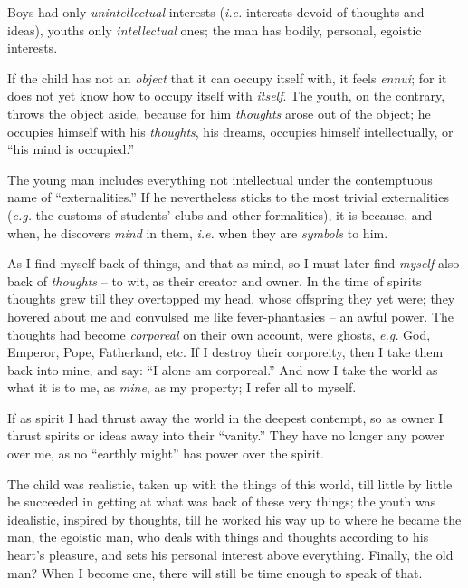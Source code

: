 Boys had only \textit{unintellectual} interests (\textit{i.e.} interests 
devoid of thoughts and ideas), youths only \textit{intellectual} ones; the man 
has bodily, personal, egoistic interests.

If the child has not an \textit{object} that it can occupy itself with, it 
feels \textit{ennui}; for it does not yet know how to occupy itself with 
\textit{itself}. The youth, on the contrary, throws the object aside, because 
for him \textit{thoughts} arose out of the object; he occupies himself with 
his \textit{thoughts}, his dreams, occupies himself intellectually, or ``his 
mind is occupied.''

The young man includes everything not intellectual under the contemptuous name 
of ``externalities.'' If he nevertheless sticks to the most trivial 
externalities (\textit{e.g.} the customs of students' clubs and other 
formalities), it is because, and when, he discovers \textit{mind} in them, 
\textit{i.e.} when they are \textit{symbols} to him.

As I find myself back of things, and that as mind, so I must later find 
\textit{myself} also back of \textit{thoughts} -- to wit, as their creator and 
owner. In the time of spirits thoughts grew till they overtopped my head, 
whose offspring they yet were; they hovered about me and convulsed me like 
fever-phantasies -- an awful power. The thoughts had become \textit{corporeal} 
on their own account, were ghosts, \textit{e.g.} God, Emperor, Pope, 
Fatherland, etc. If I destroy their corporeity, then I take them back into 
mine, and say: ``I alone am corporeal.'' And now I take the world as what it 
is to me, as \textit{mine}, as my property; I refer all to myself.

If as spirit I had thrust away the world in the deepest contempt, so as owner 
I thrust spirits or ideas away into their ``vanity.'' They have no longer 
any power over me, as no ``earthly might'' has power over the spirit.

The child was realistic, taken up with the things of this world, till little 
by little he succeeded in getting at what was back of these very things; the 
youth was idealistic, inspired by thoughts, till he worked his way up to where 
he became the man, the egoistic man, who deals with things and thoughts 
according to his heart's pleasure, and sets his personal interest above 
everything. Finally, the old man? When I become one, there will still be time 
enough to speak of that.
